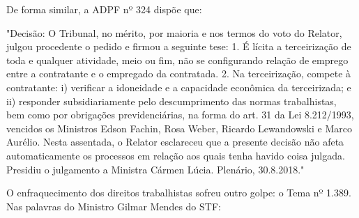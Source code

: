 De forma similar, a ADPF nº 324 dispõe que:

\noindent
\begin{flushleft}
	\setlength{\leftskip}{4cm}
	\small
	"Decisão: O Tribunal, no mérito, por maioria e nos termos do voto do Relator, julgou procedente o pedido e firmou a seguinte tese: 1. É lícita a terceirização de toda e qualquer atividade, meio ou fim, não se configurando relação de emprego entre a contratante e o empregado da contratada. 2. Na terceirização, compete à contratante: i) verificar a idoneidade e a capacidade econômica da terceirizada; e ii) responder subsidiariamente pelo descumprimento das normas trabalhistas, bem como por obrigações previdenciárias, na forma do art. 31 da Lei 8.212/1993, vencidos os Ministros Edson Fachin, Rosa Weber, Ricardo Lewandowski e Marco Aurélio. Nesta assentada, o Relator esclareceu que a presente decisão não afeta automaticamente os processos em relação aos quais tenha havido coisa julgada. Presidiu o julgamento a Ministra Cármen Lúcia. Plenário, 30.8.2018." \cite{adpf324}
\end{flushleft}

O enfraquecimento dos direitos trabalhistas sofreu outro golpe: o Tema nº 1.389. Nas palavras do Ministro Gilmar Mendes do STF: 

